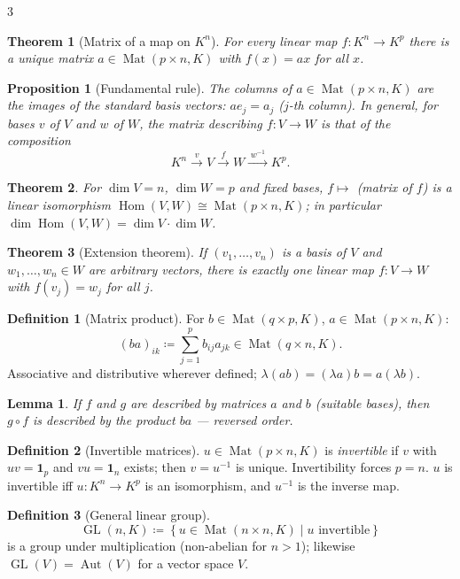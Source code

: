 \documentclass[10pt,a4paper,landscape]{article}
\theoremstyle{definition}
\newtheorem{defn}{Definition}[section]
\theoremstyle{plain}
\newtheorem{thm}{Theorem}[section]
\newtheorem{lem}{Lemma}[section]
\newtheorem{prop}{Proposition}[section]
\theoremstyle{remark}
\newcommand{\set}[1]{\left\{ #1 \right\}}
\newcommand{\deq}{\coloneqq}
\newcommand{\comp}{\circ}
\DeclareMathOperator{\Hom}{Hom}
\DeclareMathOperator{\Aut}{Aut}
\DeclareMathOperator{\Mat}{Mat}
\DeclareMathOperator{\GL}{GL}
\newcommand{\one}{\mathbf{1}}
\begin{document}
\begin{multicols*}{3}
\begin{thm}[Matrix of a map on $K^n$]
For every linear map $f: K^n \to K^p$ there is a \emph{unique} matrix $a \in \Mat(p \times n, K)$ with $f(x) = ax$ for all $x$.
\end{thm}

\begin{prop}[Fundamental rule]
The columns of $a \in \Mat(p \times n, K)$ are the images of the standard basis vectors: $ae_j = a_j$ ($j$-th column). In general, for bases $v$ of $V$ and $w$ of $W$, the matrix describing $f: V \to W$ is that of the composition
\[
K^n \xrightarrow{\;v\;} V \xrightarrow{\;f\;} W \xrightarrow{\;w^{-1}\;} K^p .
\]
\end{prop}

\begin{thm}
For $\dim V = n$, $\dim W = p$ and fixed bases, $f \mapsto$ (matrix of $f$) is a linear isomorphism $\Hom(V,W) \cong \Mat(p \times n, K)$; in particular $\dim \Hom(V,W) = \dim V \cdot \dim W$.
\end{thm}

\begin{thm}[Extension theorem]
If $(v_1, \dots, v_n)$ is a basis of $V$ and $w_1, \dots, w_n \in W$ are arbitrary vectors, there is exactly one linear map $f: V \to W$ with $f(v_j) = w_j$ for all $j$.
\end{thm}

\begin{defn}[Matrix product]
For $b \in \Mat(q \times p, K)$, $a \in \Mat(p \times n, K)$:
\[
(ba)_{ik} \deq \sum_{j=1}^{p} b_{ij}a_{jk} \in \Mat(q \times n, K).
\]
Associative and distributive wherever defined; $\lambda(ab) = (\lambda a)b = a(\lambda b)$.
\end{defn}

\begin{lem}
If $f$ and $g$ are described by matrices $a$ and $b$ (suitable bases), then $g \comp f$ is described by the product $ba$ --- \emph{reversed order}.
\end{lem}

\begin{defn}[Invertible matrices]
$u \in \Mat(p \times n, K)$ is \emph{invertible} if $v$ with $uv = \one_p$ and $vu = \one_n$ exists; then $v = u^{-1}$ is unique. Invertibility forces $p = n$. $u$ is invertible iff $u: K^n \to K^p$ is an isomorphism, and $u^{-1}$ is the inverse map.
\end{defn}

\begin{defn}[General linear group]
\[
\GL(n,K) \deq \set{u \in \Mat(n \times n, K) \mid u \text{ invertible}}
\]
is a group under multiplication (non-abelian for $n > 1$); likewise $\GL(V) = \Aut(V)$ for a vector space $V$.
\end{defn}


\end{multicols*}
\end{document}
